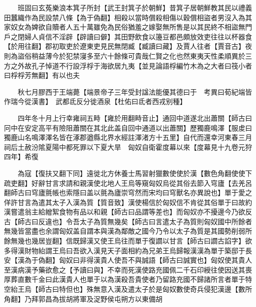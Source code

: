 　　班固曰玄菟樂浪本箕子所封【武王封箕子於朝鮮】昔箕子居朝鮮教其民以禮義田蠶織作為民設禁八條【為于偽翻】相殺以當時償殺相傷以穀償相盜者男沒入為其家奴女為婢欲自贖者人五十萬雖免為民俗猶羞之嫁娶無所售是以其民終不相盜無門戶之閉婦人貞信不淫辟【辟讀曰僻】其田野飲食以籩豆都邑頗放效吏往往以杯器食【於用往翻】郡初取吏於遼東吏見民無閉臧【臧讀曰藏】及賈人往者【賈音古】夜則為盜俗稍益薄今於犯禁寖多至六十餘條可貴哉仁賢之化也然東夷天性柔順異於三方之外故孔子悼道不行設浮桴于海欲居九夷【並見論語桴編竹木為之大者曰筏小者曰桴桴芳無翻】有以也夫

　　秋七月膠西于王端薨【端景帝子三年受封諡法能優其德曰于　考異曰荀紀端皆作瑞今從漢書】　武都氐反分徙酒泉【杜佑曰氐者西戎别種】

　　四年冬十月上行幸雍祠五畤【雍於用翻畤音止】通回中道遂北出蕭關【師古曰冋中在安定高平有險阻蕭關在其北此盖自回中通道以出蕭關】歷獨鹿鳴澤【服䖍曰獨鹿山名鳴澤澤名皆在涿郡遒縣北界水經註澤渚方十五里】自代而還幸河東春三月祠后土赦汾隂夏陽中都死罪以下夏大旱　匈奴自衛霍度幕以來【度幕見十九卷元狩四年】希復

　　為寇【復扶又翻下同】遠徙北方休養士馬習射獵數使使於漢【數色角翻使使下疏吏翻】好辭甘言求請和親漢使北地人王烏等窺匈奴烏從其俗去節入穹廬【去羌呂翻師古曰穹廬氈帳也索隱曰盖以氈為廬崇穹然而宋均曰穹獸名亦異說也】單于愛之佯許甘言為遣其太子入漢為質【質音致】漢使楊信於匈奴信不肯從其俗單于曰故約漢嘗遣翁主給繒絮食物有品以和親【師古曰品謂等差也】而匈奴亦不擾邊今乃欲反古【師古曰反違也】令吾太子為質無幾矣【師古曰言遣太子為質則匈奴國中所餘者無幾皆當盡也余謂匈奴盖自謂本與漢為鄰敵之國今乃令以太子為質是其國勢削弱所餘無幾也幾居豈翻】信既歸漢又使王烏往而單于復讇以甘言【師古曰讇古諂字】欲多得漢財物紿謂王烏曰吾欲入漢見天子面相約為兄弟王烏歸報漢漢為單于築邸于長安【漢為于偽翻】匈奴曰非得漢貴人使吾不與誠語【師古曰誠實也】匈奴使其貴人至漢病漢予藥欲愈之【予讀曰與】不幸而死漢使路充國佩二千石印綬往使因送其喪厚葬直數千金曰此漢貴人也單于以為漢殺吾貴使者乃留路充國不歸諸所言者單于特空紿王烏【師古曰特但也】殊無意入漢及遣太子於是匈奴數使奇兵侵犯漢邊【數所角翻】乃拜郭昌為拔胡將軍及浞野侯屯朔方以東備胡

